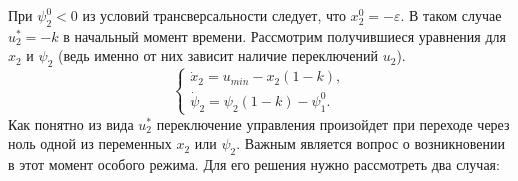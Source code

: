 \documentclass[10pt]{article}
\begin{document}
	При \( \psi_2^0 < 0 \) из условий трансверсальности следует, что \( x_2^0 = -\varepsilon \). В таком случае \( u_2^* = -k\) в начальный момент времени. Рассмотрим получившиеся уравнения для \( x_2 \) и \( \psi_2 \) (ведь именно от них зависит наличие переключений \( u_2 \)).
		\begin{equation} \label{syst_7}
			\begin{cases}
				\dot{x}_2 = u_{min} - x_2(1 - k), 
				\\
				\dot{\psi}_2 = \psi_2(1 - k) - \psi_1^0.
			\end{cases}
		\end{equation}
	Как понятно из вида \( u_2^* \) переключение управления произойдет при переходе через ноль одной из переменных \( x_2 \) или \( \psi_2 \). Важным является вопрос о возникновении в этот момент особого режима. Для его решения нужно рассмотреть два случая:
\end{document}
